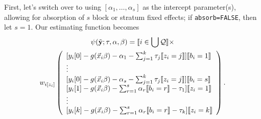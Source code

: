 \documentclass{article}
\DeclarePairedDelimiter{\indicator}{\llbracket}{\rrbracket}
\newcommand{\owt}[1][z_i]{\ensuremath{w_{i[#1]}}}
\begin{document}
First, let's switch over to using $[\alpha_{1}, \ldots, \alpha_{s}]$
as the intercept parameter(s), allowing for absorption of $s$ block or
stratum fixed effects; if \texttt{absorb=FALSE}, then let $s=1$.    Our estimating function becomes
\begin{multline}
  \label{eq:9}
  \psi(\tilde{\mathbf{y}}; \tau, \alpha, \beta) =
  \indicator{i \in \bigcup \mathcal{Q}} \times \\
  \owt{}
  \left(
    \begin{array}{l}
           [y_{i}[0] - g(\vec{x}_{i}\beta)-
                  \alpha_{1} -
      \sum_{j=1}^{k}\tau_{j}\indicator{z_{i}=j}]\indicator{b_{i}=1}\\
      \vdots\\ 
          {} [y_{i}[0] - g(\vec{x}_{i}\beta)-
                  \alpha_{s} -
      \sum_{j=1}^{k}\tau_{j}\indicator{z_{i}=j}]\indicator{b_{i}=s}\\      
         {}  [y_{i}[1] - g(\vec{x}_{i}\beta)-
                  \sum_{r=1}^s\alpha_r\indicator{b_i=r}-\tau_{1}]\indicator{z_{i}=1}\\
                  \vdots \\
          {} [y_{i}[k] - g(\vec{x}_{i}\beta)-
                 \sum_{r=1}^s\alpha_r\indicator{b_i=r} - \tau_{k}]\indicator{z_{i}=k}\\
    \end{array}
\right).
\end{multline}
\end{document}
